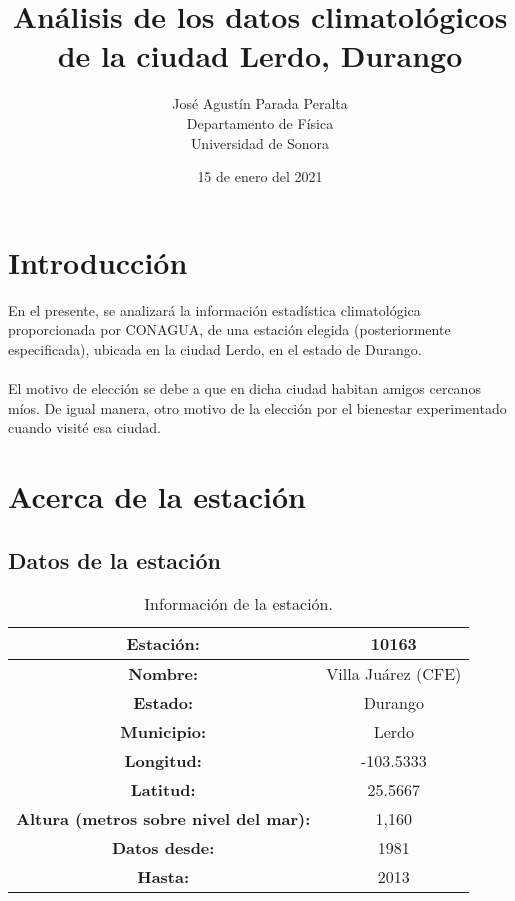 \documentclass[12pt]{article}
\title{Análisis de los datos climatológicos de la ciudad Lerdo, Durango}
\author{José Agustín Parada Peralta\\
Departamento de Física\\
Universidad de Sonora}
\date{15 de enero del 2021}
\begin{document}
\maketitle

\section{Introducción}

En el presente, se analizará la información estadística climatológica proporcionada por CONAGUA, de una estación elegida (posteriormente especificada), ubicada en la ciudad Lerdo, en el estado de Durango.\\\\El motivo de elección se debe a que en dicha ciudad habitan amigos cercanos míos. De igual manera, otro motivo de la elección por el bienestar experimentado cuando visité esa ciudad.

\section{Acerca de la estación}
\subsection{Datos de la estación}

\begin{table}[h]
\begin{center}
    \begin{tabular}{|c||c|}
    \hline
        \textbf{Estación:} & 10163 \\ \hline
        \textbf{Nombre:} & Villa Juárez (CFE) \\ \hline
        \textbf{Estado:} & Durango \\ \hline
        \textbf{Municipio:} & Lerdo \\ \hline
        \textbf{Longitud:} & -103.5333 \\ \hline
        \textbf{Latitud:} & 25.5667 \\ \hline
        \textbf{Altura (metros sobre nivel del mar):} & 1,160 \\ \hline
        \textbf{Datos desde:} & 1981 \\ \hline
        \textbf{Hasta:} & 2013 \\ \hline
    \end{tabular}
    \end{center}
    \caption{Información de la estación.}
    \end{table}
\end{document}
